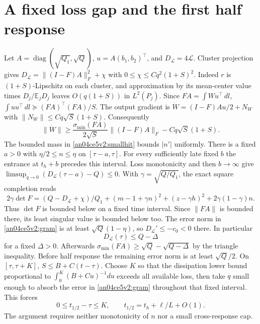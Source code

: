 \documentclass[11pt]{article}
\newcommand{\dd}{\,dl}
\newcommand{\Ll}{\mathcal L}
\newcommand{\E}{\mathbb E}
\begin{document}
\section{A fixed loss gap and the first half response}\label{an04ce5v2:half}
Let $A=\operatorname{diag}(\sqrt{Q_1},\sqrt Q)$, $u=A(b_1,b_2)^\top$, and $D_{\Ll}=4\Ll$.
Cluster projection gives $D_{\Ll}=\|(I-F)A\|_F^2+\chi$ with $0\le\chi\le Cq^2(1+S)^2$. Indeed $r$ is $(1+S)$-Lipschitz on each cluster, and approximation by its mean-center value times $D_j/\E_jD_j$ leaves $O(q(1+S))$ in $L^2(P_j)$. Since $FA=\int Wu^\top\dd$, $\int uu^\top\dd\succeq (FA)^\top(FA)/S$. The output gradient is $\dot W=(I-F)Au/2+N_W$ with $\|N_W\|\le Cq\sqrt S(1+S)$. Consequently
\begin{equation}\label{an04ce5v2:gram}
 \|\dot W\|\ge\frac{\sigma_{\min}(FA)}{2\sqrt S}\|(I-F)A\|_F-Cq\sqrt S(1+S).
\end{equation}
The bounded mass in \eqref{an04ce5v2:smallhit} bounds $|n'|$ uniformly. There is a fixed $a>0$ with $\eta/2\le n\le\eta$ on $[\tau-a,\tau]$. For every sufficiently late fixed $b$ the entrance at $t_h+b$ precedes this interval. Loss monotonicity and then $b\to\infty$ give $\limsup_{q\to0}(D_{\Ll}(\tau-a)-Q)\le0$. With $\gamma=\sqrt{Q/Q_1}$, the exact square completion reads
\[
 2\gamma\det F=(Q-D_{\Ll}+\chi)/Q_1+
 (m-1+\gamma n)^2+(z-\gamma h)^2+2\gamma(1-\gamma)n .
\]
Thus $\det F$ is bounded below on a fixed time interval. Since $\|FA\|$ is bounded there, its least singular value is bounded below too. The error norm in \eqref{an04ce5v2:gram} is at least $\sqrt Q(1-\eta)$, so $D_{\Ll}'\le-c_0<0$ there. In particular
\begin{equation}\label{an04ce5v2:gap}
 D_{\Ll}(\tau)\le Q-\Delta
\end{equation}
for a fixed $\Delta>0$. Afterwards $\sigma_{\min}(FA)\ge\sqrt Q-\sqrt{Q-\Delta}$ by the triangle inequality. Before half response the remaining error norm is at least $\sqrt Q/2$. On $[\tau,\tau+K]$, $S\le B+C(t-\tau)$. Choose $K$ so that the dissipation lower bound proportional to $\int_0^K (B+Cu)^{-1}du$ exceeds all available loss, then take $q$ small enough to absorb the error in \eqref{an04ce5v2:gram} throughout that fixed interval. This forces
\begin{equation}\label{an04ce5v2:halfclock}
 0\le t_{1/2}-\tau\le K,\qquad t_{1/2}=t_h+\ell/L+O(1).
\end{equation}
The argument requires neither monotonicity of $n$ nor a small cross-response cap.
\end{document}
